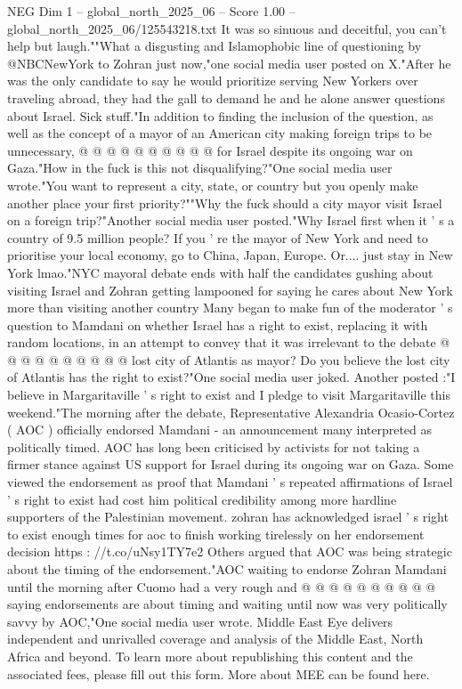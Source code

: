 \begin{textsample}{NEG Dim 1 – global\_north\_2025\_06 – Score 1.00 – global\_north\_2025\_06/125543218.txt}
It was so sinuous and deceitful, you can't help but laugh.""What a disgusting and Islamophobic line of questioning by @NBCNewYork to Zohran just now,"one social media user posted on X."After he was the only candidate to say he would prioritize serving New Yorkers over traveling abroad, they had the gall to demand he and he alone answer questions about Israel.
Sick stuff."In addition to finding the inclusion of the question, as well as the concept of a mayor of an American city making foreign trips to be unnecessary, @ @ @ @ @ @ @ @ @ @ for Israel despite its ongoing war on Gaza."How in the fuck is this not disqualifying?"One social media user wrote."You want to represent a city, state, or country but you openly make another place your first priority?""Why the fuck should a city mayor visit Israel on a foreign trip?"Another social media user posted."Why Israel first when it ' s a country of 9.5 million people?
If you ' re the mayor of New York and need to prioritise your local economy, go to China, Japan, Europe.
Or.... just stay in New York lmao."NYC mayoral debate ends with half the candidates gushing about visiting Israel and Zohran getting lampooned for saying he cares about New York more than visiting another country Many began to make fun of the moderator ' s question to Mamdani on whether Israel has a right to exist, replacing it with random locations, in an attempt to convey that it was irrelevant to the debate @ @ @ @ @ @ @ @ @ @ lost city of Atlantis as mayor?
Do you believe the lost city of Atlantis has the right to exist?"One social media user joked.
Another posted :"I believe in Margaritaville ' s right to exist and I pledge to visit Margaritaville this weekend."The morning after the debate, Representative Alexandria Ocasio-Cortez ( AOC ) officially endorsed Mamdani - an announcement many interpreted as politically timed.
AOC has long been criticised by activists for not taking a firmer stance against US support for Israel during its ongoing war on Gaza.
Some viewed the endorsement as proof that Mamdani ' s repeated affirmations of Israel ' s right to exist had cost him political credibility among more hardline supporters of the Palestinian movement. zohran has acknowledged israel ' s right to exist enough times for aoc to finish working tirelessly on her endorsement decision https : //t.co/uNsy1TY7e2 Others argued that AOC was being strategic about the timing of the endorsement."AOC waiting to endorse Zohran Mamdani until the morning after Cuomo had a very rough and @ @ @ @ @ @ @ @ @ @ saying endorsements are about timing and waiting until now was very politically savvy by AOC,"One social media user wrote.
Middle East Eye delivers independent and unrivalled coverage and analysis of the Middle East, North Africa and beyond.
To learn more about republishing this content and the associated fees, please fill out this form.
More about MEE can be found here.

\end{textsample}
